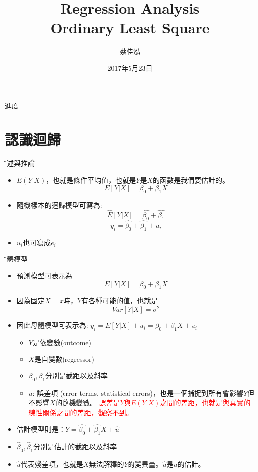 \documentclass[xcolor=dvipsnames]{beamer}
\author[蔡佳泓]{\K 蔡佳泓}
\title[Statistical Methods for Social Sciences]{Regression Analysis\\
\smallskip
{\small {Ordinary Least Square}}}
\date[5/23/2017]{2017年5月23日} %
\institute[ESC \& GIEAS]{\H 國立政治大學選舉研究中心暨東亞研究所}
\begin{document}
\maketitle
\begin{frame}{進度}
\tableofcontents
\end{frame}


\section{認識迴歸}
\begin{frame}{\H 描述與推論}
\begin{itemize}
\item $ E(Y|X) $，也就是條件平均值，也就是$Y$是$X$的函數是我們要估計的。
\[E[Y|X]=\beta_{0}+\beta_{1}X\]
\item 隨機樣本的迴歸模型可寫為:
\[\hat{E}[Y|X]=\hat{\beta_{0}}+\hat{\beta_{1}}\]
\[y_{i}=\hat{\beta_{0}}+\hat{\beta_{1}}+u_{i}\]
\item $u_{i}$也可寫成$e_{i}$
\end{itemize}
\end{frame}

\begin{frame}{\H 母體模型}
\begin{itemize}
\item 預測模型可表示為 
\[ E[Y|X]=\beta_{0}+\beta_{1}X \]
\item 因為固定$X=x$時，$Y$有各種可能的值，也就是
\[Var[Y|X]=\sigma^2 \]
\item 因此母體模型可表示為: $y_{i}=E[Y|X]+u_{i}=\beta_{0}+\beta_{1}X+u_{i} $
\begin{itemize}
\item $Y$是依變數(outcome)
\item $X$是自變數(regressor)
\item $\beta_{0},\beta_{1}  $分別是截距以及斜率
\item $ u $: 誤差項 (error terms, statistical errors)，也是一個捕捉到所有會影響$Y$但不影響$X$的隨機變數。
\textcolor{red}{\K 誤差是$Y$與$E(Y|X)$之間的差距，也就是與真實的線性關係之間的差距，觀察不到。}
\end{itemize}
\item 估計模型則是：$Y=\hat{\beta_{0}}+\hat{\beta_{1}}X+\hat{u}  $
\item $\hat{\beta}_{0},\hat{\beta}_{1}  $分別是估計的截距以及斜率
\item $\hat{u}$代表殘差項，也就是$X$無法解釋的$Y$的變異量。$\hat{u}$是$u$的估計。
\end{itemize}
\end{frame}
\end{document}
